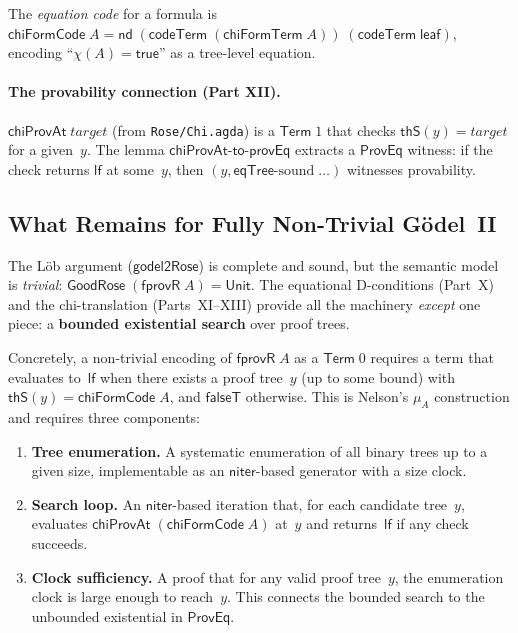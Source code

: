 \documentclass[11pt]{article}
\newcommand{\lf}{\mathsf{lf}}
\newcommand{\nd}{\mathsf{nd}}
\newcommand{\niter}{\mathsf{niter}}
\newcommand{\codeTerm}{\mathsf{codeTerm}}
\newcommand{\thS}{\mathsf{thS}}
\newcommand{\eqTree}{\mathsf{eqTree}}
\newcommand{\Term}{\mathsf{Term}}
\begin{document}
The \emph{equation code} for a formula is
$\mathsf{chiFormCode}\;A = \nd\;(\codeTerm\;(\mathsf{chiFormTerm}\;A))\;(\codeTerm\;\mathsf{leaf})$,
encoding ``$\chi(A) = \mathsf{true}$'' as a tree-level equation.

\paragraph{The provability connection (Part XII).}
$\mathsf{chiProvAt}\;\mathit{target}$ (from \texttt{Rose/Chi.agda}) is a
$\Term\;1$ that checks $\thS(y) = \mathit{target}$ for a given~$y$.
The lemma $\mathsf{chiProvAt\text{-}to\text{-}provEq}$ extracts a
$\mathsf{ProvEq}$ witness: if the check returns $\lf$ at some~$y$,
then $(y, \eqTree\text{-sound}\;\ldots)$ witnesses provability.

\subsection{What Remains for Fully Non-Trivial G\"odel~II}\label{sec:remains}

The L\"ob argument ($\mathsf{godel2Rose}$) is complete and sound, but the
semantic model is \emph{trivial}: $\mathsf{GoodRose}\;(\mathsf{fprovR}\;A) =
\mathsf{Unit}$. The equational D-conditions (Part~X) and the chi-translation
(Parts~XI--XIII) provide all the machinery \emph{except} one piece: a
\textbf{bounded existential search} over proof trees.

Concretely, a non-trivial encoding of $\mathsf{fprovR}\;A$ as a $\Term\;0$
requires a term that evaluates to~$\lf$ when there exists a proof tree~$y$
(up to some bound) with $\thS(y) = \mathsf{chiFormCode}\;A$, and
$\mathsf{falseT}$ otherwise. This is Nelson's $\mu_A$ construction and
requires three components:

\begin{enumerate}
  \item \textbf{Tree enumeration.} A systematic enumeration of all binary
    trees up to a given size, implementable as an $\niter$-based generator
    with a size clock.
  \item \textbf{Search loop.} An $\niter$-based iteration that, for each
    candidate tree~$y$, evaluates $\mathsf{chiProvAt}\;(\mathsf{chiFormCode}\;A)$
    at~$y$ and returns~$\lf$ if any check succeeds.
  \item \textbf{Clock sufficiency.} A proof that for any valid proof tree~$y$,
    the enumeration clock is large enough to reach~$y$. This connects the
    bounded search to the unbounded existential in $\mathsf{ProvEq}$.
\end{enumerate}
\end{document}
